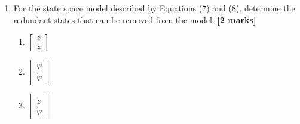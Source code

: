 \documentclass{article}
\begin{document}
\begin{enumerate}[resume]
\begin{enumerate}[label=\alph*.]
        \item $\mathbf{y} = \begin{bmatrix} 1 & 0 & 0 & 0 \\ 0 & 0 & 1 & 0 \end{bmatrix} \mathbf{x} + \begin{bmatrix} 0 & 0 \\ 0 & 0 \end{bmatrix} \mathbf{u} + \begin{bmatrix} 0 \\ 0 \end{bmatrix} [g] \hfill (8)$
        \vspace{2mm}

        \item $\mathbf{y} = \begin{bmatrix} 0 & 1 & 0 & 1 \end{bmatrix} \mathbf{x} + \begin{bmatrix} 0 & 0 \end{bmatrix} \mathbf{u} + [0][g] \hfill (8)$
        \vspace{2mm}

        \item None of the above.
    \end{enumerate}

    \vspace{0.5cm}

    \item For the state space model described by Equations (7) and (8), determine the redundant states that can be removed from the model. \hfill \textbf{[2 marks]}
    
    \begin{enumerate}[label=\alph*.]
        \item $\begin{bmatrix} z \\ \dot{z} \end{bmatrix}$
        \vspace{2mm}

        \item $\begin{bmatrix} \varphi \\ \dot{\varphi} \end{bmatrix}$
        \item $\begin{bmatrix} \dot{z} \\ \dot{\varphi} \end{bmatrix}$
        \vspace{2mm}


\end{enumerate}
\end{enumerate}
\end{document}
